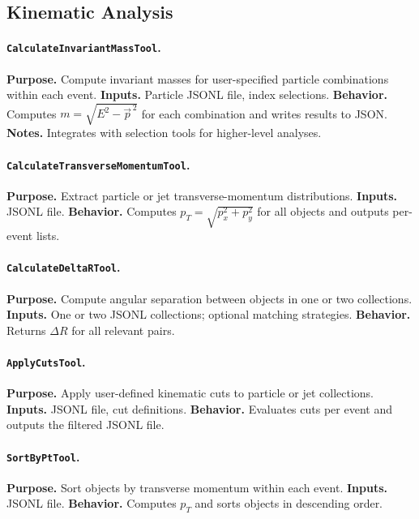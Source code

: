 \documentclass[11pt,oneside]{article}
\numberwithin{equation}{section}
\begin{document}
\begin{appendix}

\subsection{Kinematic Analysis}

\paragraph{\texttt{CalculateInvariantMassTool}.}
\textbf{Purpose.} Compute invariant masses for user-specified particle combinations within each event.  
\textbf{Inputs.} Particle JSONL file, index selections.  
\textbf{Behavior.} Computes $m=\sqrt{E^2 - \vec p^{\,2}}$ for each combination and writes results to JSON.  
\textbf{Notes.} Integrates with selection tools for higher-level analyses.

\paragraph{\texttt{CalculateTransverseMomentumTool}.}
\textbf{Purpose.} Extract particle or jet transverse-momentum distributions.  
\textbf{Inputs.} JSONL file.  
\textbf{Behavior.} Computes $p_T=\sqrt{p_x^2+p_y^2}$ for all objects and outputs per-event lists.  

\paragraph{\texttt{CalculateDeltaRTool}.}
\textbf{Purpose.} Compute angular separation between objects in one or two collections.  
\textbf{Inputs.} One or two JSONL collections; optional matching strategies.  
\textbf{Behavior.} Returns $\Delta R$ for all relevant pairs.  

\paragraph{\texttt{ApplyCutsTool}.}
\textbf{Purpose.} Apply user-defined kinematic cuts to particle or jet collections.  
\textbf{Inputs.} JSONL file, cut definitions.  
\textbf{Behavior.} Evaluates cuts per event and outputs the filtered JSONL file.  

\paragraph{\texttt{SortByPtTool}.}
\textbf{Purpose.} Sort objects by transverse momentum within each event.  
\textbf{Inputs.} JSONL file.  
\textbf{Behavior.} Computes $p_T$ and sorts objects in descending order.  


\end{appendix}
\end{document}
